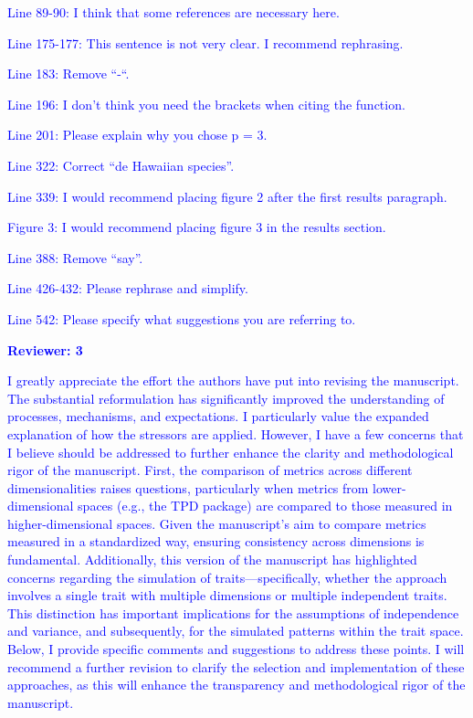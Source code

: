 \documentclass[
]{article}
\begin{document}
\textcolor{blue}{Line 89-90: I think that some references are necessary here.}

\textcolor{blue}{Line 175-177: This sentence is not very clear. I recommend rephrasing.}

\textcolor{blue}{Line 183: Remove “-“.}

\textcolor{blue}{Line 196: I don’t think you need the brackets when citing the function. }

\textcolor{blue}{Line 201: Please explain why you chose p = 3.}

\textcolor{blue}{Line 322: Correct “de Hawaiian species”.}

\textcolor{blue}{Line 339: I would recommend placing figure 2 after the first results paragraph.}

\textcolor{blue}{Figure 3: I would recommend placing figure 3 in the results section. }

\textcolor{blue}{Line 388: Remove “say”.}

\textcolor{blue}{Line 426-432: Please rephrase and simplify.}

\textcolor{blue}{Line 542: Please specify what suggestions you are referring to.}


\textcolor{blue}{\textbf{Reviewer: 3}}

\textcolor{blue}{I greatly appreciate the effort the authors have put into revising the manuscript. The substantial reformulation has significantly improved the understanding of processes, mechanisms, and expectations. I particularly value the expanded explanation of how the stressors are applied. However, I have a few concerns that I believe should be addressed to further enhance the clarity and methodological rigor of the manuscript. First, the comparison of metrics across different dimensionalities raises questions, particularly when metrics from lower-dimensional spaces (e.g., the TPD package) are compared to those measured in higher-dimensional spaces. Given the manuscript's aim to compare metrics measured in a standardized way, ensuring consistency across dimensions is fundamental. Additionally, this version of the manuscript has highlighted concerns regarding the simulation of traits—specifically, whether the approach involves a single trait with multiple dimensions or multiple independent traits. This distinction has important implications for the assumptions of independence and variance, and subsequently, for the simulated patterns within the trait space. Below, I provide specific comments and suggestions to address these points. I will recommend a further revision to clarify the selection and implementation of these approaches, as this will enhance the transparency and methodological rigor of the manuscript.}
\end{document}
